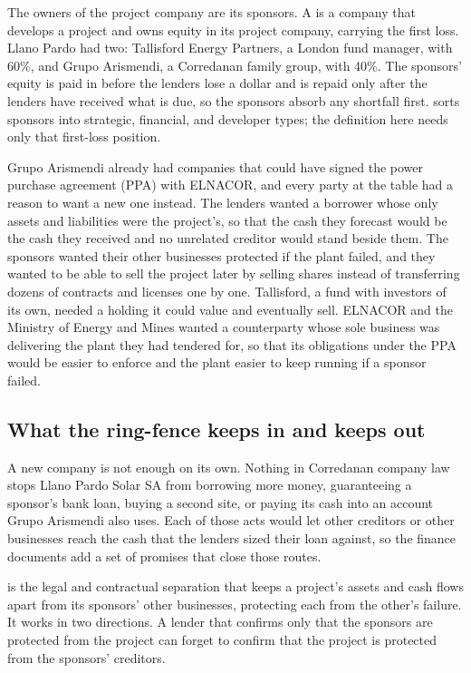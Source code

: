 The owners of the project company are its sponsors. A  is a company that develops a project and owns equity in its project company, carrying the first loss. Llano Pardo had two: Tallisford Energy Partners, a London fund manager, with 60\%, and Grupo Arismendi, a Corredanan family group, with 40\%. The sponsors' equity is paid in before the lenders lose a dollar and is repaid only after the lenders have received what is due, so the sponsors absorb any shortfall first.  sorts sponsors into strategic, financial, and developer types; the definition here needs only that first-loss position.

Grupo Arismendi already had companies that could have signed the power purchase agreement (PPA) with ELNACOR, and every party at the table had a reason to want a new one instead. The lenders wanted a borrower whose only assets and liabilities were the project's, so that the cash they forecast would be the cash they received and no unrelated creditor would stand beside them. The sponsors wanted their other businesses protected if the plant failed, and they wanted to be able to sell the project later by selling shares instead of transferring dozens of contracts and licenses one by one. Tallisford, a fund with investors of its own, needed a holding it could value and eventually sell. ELNACOR and the Ministry of Energy and Mines wanted a counterparty whose sole business was delivering the plant they had tendered for, so that its obligations under the PPA would be easier to enforce and the plant easier to keep running if a sponsor failed.

\subsection{What the ring-fence keeps in and keeps out}\label{ssec:2.1.2}

A new company is not enough on its own. Nothing in Corredanan company law stops Llano Pardo Solar SA from borrowing more money, guaranteeing a sponsor's bank loan, buying a second site, or paying its cash into an account Grupo Arismendi also uses. Each of those acts would let other creditors or other businesses reach the cash that the lenders sized their loan against, so the finance documents add a set of promises that close those routes.

 is the legal and contractual separation that keeps a project's assets and cash flows apart from its sponsors' other businesses, protecting each from the other's failure. It works in two directions. A lender that confirms only that the sponsors are protected from the project can forget to confirm that the project is protected from the sponsors' creditors.

